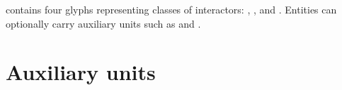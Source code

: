 \SBGNERLone{} contains four glyphs representing classes of interactors: , ,  and . Entities can optionally carry auxiliary units such as  and .






\section{Auxiliary units}\label{sec:aux}




%
 
%

 

 
%
%
%

 

 
